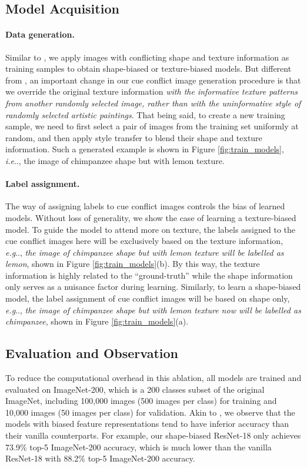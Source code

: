 \documentclass{article} \usepackage{iclr2021_conference,times}
\makeatletter
\DeclareRobustCommand\onedot{\futurelet\@let@token\@onedot}
\def\@onedot{\ifx\@let@token.\else.\null\fi\xspace}
\def\eg{\emph{e.g}\onedot} \def\Eg{\emph{E.g}\onedot}
\def\ie{\emph{i.e}\onedot} \def\Ie{\emph{I.e}\onedot}
\makeatother
\begin{document}
\subsection{Model Acquisition} \label{sec:biased_acq}
\paragraph{Data generation.} Similar to \citet{geirhos2018imagenettrained}, we apply images with conflicting shape and texture information as training samples to obtain shape-biased or texture-biased models. But different from  \citet{geirhos2018imagenettrained}, an important change in our cue conflict image generation procedure is that we override the original texture information \emph{with the informative texture patterns from another randomly selected image, rather than with the uninformative style of randomly selected artistic paintings}.
That being said, to create a new training sample, we need to first select a pair of images from the training set uniformly at random, and then apply style transfer to blend their shape and texture information. Such a generated example is shown in Figure \ref{fig:train_models}, \ie, the image of chimpanzee shape but with lemon texture.


\paragraph{Label assignment.}
The way of assigning labels to cue conflict images controls the bias of learned models. Without loss of generality, we show the case of learning a texture-biased model. To guide the model to attend more on texture, the labels assigned to the cue conflict images here will be exclusively based on the texture information, \eg, \emph{the image of chimpanzee shape but with lemon texture will be labelled as lemon}, shown in Figure \ref{fig:train_models}(b).  By this way, the texture information is highly related to the ``ground-truth'' while the shape information only serves as a nuisance factor during learning.  Similarly, to learn a shape-biased model, the label assignment of cue conflict images will be based on shape only, \eg, \emph{the image of chimpanzee shape but with lemon texture now will be labelled as chimpanzee}, shown in Figure \ref{fig:train_models}(a).



\subsection{Evaluation and Observation}
To reduce the computational overhead in this ablation, all models are trained and evaluated on ImageNet-200, which is a 200 classes subset of the original ImageNet, including 100,000 images (500 images per class) for training and 10,000 images (50 images per class) for validation.  Akin to \citet{geirhos2018imagenettrained}, we observe that the models with biased feature representations tend to have inferior accuracy than their vanilla counterparts. For example, our shape-biased ResNet-18 only achieves 73.9\% top-5 ImageNet-200 accuracy, which is much lower than the vanilla ResNet-18 with 88.2\% top-5 ImageNet-200 accuracy.
\end{document}
